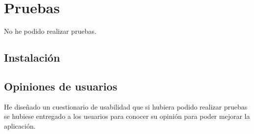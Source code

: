     \section{Pruebas}\label{pru}
    No he podido realizar pruebas.
    \subsection{Instalación}
    \subsection{Opiniones de usuarios}
    He diseñado un cuestionario de usabilidad que si hubiera podido realizar pruebas se hubiese entregado a los usuarios para conocer su opinión para poder mejorar la aplicación.

